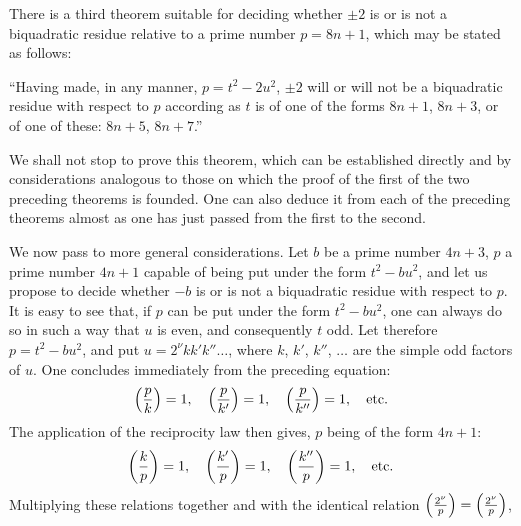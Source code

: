 \par\indent
There is a third theorem suitable for deciding whether $\pm2$ is or is not a
biquadratic residue relative to a prime number $p=8n+1$, which may be stated
as follows:
\par\indent
“Having made, in any manner, $p=t^2-2u^2$, $\pm2$ will or will not be a biquadratic
residue with respect to $p$ according as $t$ is of one of the forms $8n+1$, $8n+3$,
or of one of these: $8n+5$, $8n+7$.”
\par\indent
We shall not stop to prove this theorem, which can be established directly
and by considerations analogous to those on which the proof of the first of
the two preceding theorems is founded. One can also deduce it from each of the
preceding theorems almost as one has just passed from the first to the second.
\par\indent
We now pass to more general considerations. Let $b$ be a prime number $4n+3$,
$p$ a prime number $4n+1$ capable of being put under the form $t^2-bu^2$, and let
us propose to decide whether $-b$ is or is not a biquadratic residue with respect
to $p$. It is easy to see that, if $p$ can be put under the form $t^2-bu^2$, one
can always do so in such a way that $u$ is even, and consequently $t$ odd.
Let therefore $p=t^2-bu^2$, and put $u=2^\nu kk'k''\ldots$, where $k$, $k'$, $k''$, $\ldots$
are the simple odd factors of $u$. One concludes immediately from the preceding
equation:
\[
\left(\frac{p}{k}\right)=1,\quad \left(\frac{p}{k'}\right)=1,\quad \left(\frac{p}{k''}\right)=1,\quad\text{etc.}
\]
The application of the reciprocity law then gives, $p$ being of the form $4n+1$:
\[
\left(\frac{k}{p}\right)=1,\quad \left(\frac{k'}{p}\right)=1,\quad \left(\frac{k''}{p}\right)=1,\quad\text{etc.}
\]
Multiplying these relations together and with the identical relation $\left(\frac{2^\nu}{p}\right)=\left(\frac{2^\nu}{p}\right)$,
